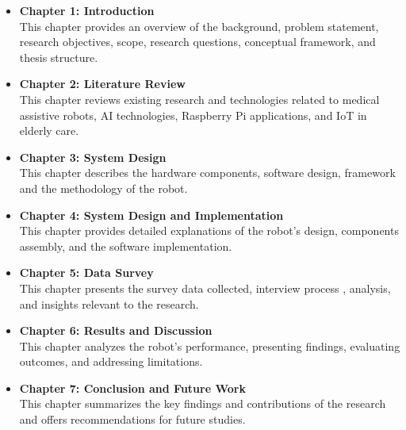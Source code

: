 \begin{itemize}
    \item \textbf{Chapter 1: Introduction} \\
    This chapter provides an overview of the background, problem statement, research objectives, scope, research questions, conceptual framework, and thesis structure.
    
    \item \textbf{Chapter 2: Literature Review} \\
    This chapter reviews existing research and technologies related to medical assistive robots, AI technologies, Raspberry Pi applications, and IoT in elderly care.
    
    \item \textbf{Chapter 3: System Design} \\
    This chapter describes the hardware components, software design, framework and the methodology of the robot.
    
    \item \textbf{Chapter 4: System Design and Implementation} \\
    This chapter provides detailed explanations of the robot's design, components assembly, and the software implementation.
    
    \item \textbf{Chapter 5: Data Survey} \\
    This chapter presents the survey data collected, interview process , analysis, and insights relevant to the research.
    
    \item \textbf{Chapter 6: Results and Discussion} \\
    This chapter analyzes the robot's performance, presenting findings, evaluating outcomes, and addressing limitations.
    
    \item \textbf{Chapter 7: Conclusion and Future Work} \\
    This chapter summarizes the key findings and contributions of the research and offers recommendations for future studies.
\end{itemize}
